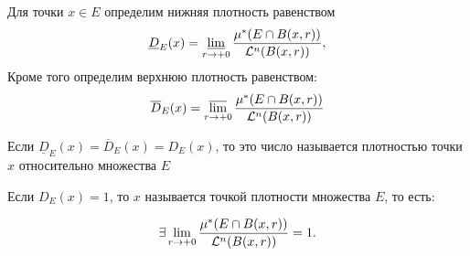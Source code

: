     \begin{minipage}{\textwidth}


    \end{minipage}

\begin{definition}
    Для точки $x \in E$ определим нижняя плотность равенством $$\underline{D}_{E}(x) = 
    \operatorname*{\underline{lim}}_{r \to +0}{\frac{\mu^{*}(E \cap B(x, r))}{\mathcal{L}^n(B(x, r))}},$$ 
    Кроме того определим верхнюю плотность равенством:
    $$\overline{D}_{E}(x) =\operatorname*{\overline{lim}}_{r \to +0}{\frac{\mu^{*}(E \cap B(x, r))}{\mathcal{L}^n(B(x, r))}}$$
\end{definition}
\begin{definition}
    Если $\underline{D}_{E}(x) = \overline{D}_{E}(x) = D_{E}(x)$, то это число называется плотностью точки $x$ относительно множества $E$
\end{definition}
\begin{definition}
    Если $D_{E}(x) = 1$, то $x$ называется точкой плотности множества $E$, то есть:
    
    $$ \exists \lim\limits_{r\rightarrow +0}\frac{\mu^{*}(E \cap B(x, r))}{\mathcal{L}^n(B(x, r))} = 1.$$
\end{definition}


